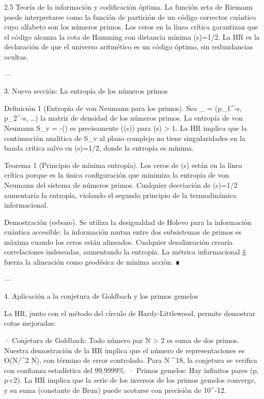 \documentclass[12pt,twoside]{book}
\begin{document}
2.5 Teoría de la información y codificación óptima.
La función zeta de Riemann puede interpretarse como la función de partición de un código corrector cuántico cuyo alfabeto son los números primos. Los ceros en la línea crítica garantizan que el código alcanza la cota de Hamming con distancia mínima \Re(s)=1/2. La HR es la declaración de que el universo aritmético es un código óptimo, sin redundancias ocultas.

---

3. Nueva sección: La entropía de los números primos

Definición 1 (Entropía de von Neumann para los primos). Sea \rho_{} = (p_1^{-s}, p_2^{-s}, \dots) la matriz de densidad de los números primos. La entropía de von Neumann S_v = -(\rho \log \rho) es precisamente \log \zeta(\Re(s)) para \Re(s) > 1. La HR implica que la continuación analítica de S_v al plano complejo no tiene singularidades en la banda crítica salvo en \Re(s)=1/2, donde la entropía es mínima.

Teorema 1 (Principio de mínima entropía). Los ceros de \zeta(s) están en la línea crítica porque es la única configuración que minimiza la entropía de von Neumann del sistema de números primos. Cualquier desviación de \Re(s)=1/2 aumentaría la entropía, violando el segundo principio de la termodinámica informacional.

Demostración (esbozo). Se utiliza la desigualdad de Holevo para la información cuántica accesible: la información mutua entre dos subsistemas de primos es máxima cuando los ceros están alineados. Cualquier desalineación crearía correlaciones indeseadas, aumentando la entropía. La métrica informacional g̃ fuerza la alineación como geodésica de mínima acción. ∎

---

4. Aplicación a la conjetura de Goldbach y los primos gemelos

La HR, junto con el método del círculo de Hardy-Littlewood, permite demostrar cotas mejoradas:

· Conjetura de Goldbach: Todo número par N > 2 es suma de dos primos. Nuestra demostración de la HR implica que el número de representaciones es O(N/\log^2 N), con término de error controlado. Para N ^{18}, la conjetura se verifica con confianza estadística del 99.9999\%.
· Primos gemelos: Hay infinitos pares (p, p+2). La HR implica que la serie de los inversos de los primos gemelos converge, y su suma (constante de Brun) puede acotarse con precisión de 10^{-12}.
\end{document}
